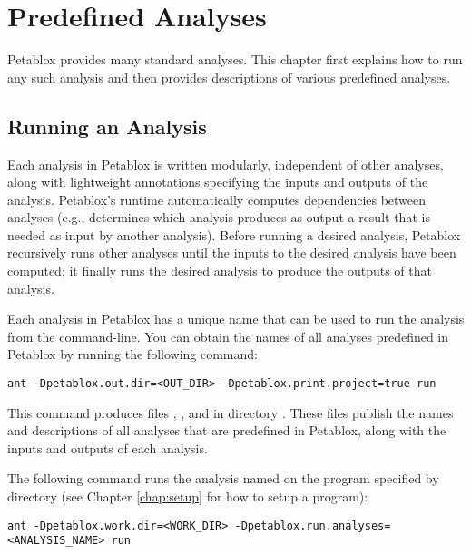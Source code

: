 \chapter{Predefined Analyses}
\label{chap:predefined}

Petablox provides many standard analyses.
This chapter first explains how to run any such analysis and then provides
descriptions of various predefined analyses.

\section{Running an Analysis}
\label{sec:running-predefined}

Each analysis in Petablox is written modularly, independent of other analyses,
along with lightweight annotations specifying the inputs and outputs of the
analysis.  Petablox's runtime automatically computes dependencies between analyses
(e.g., determines which analysis produces as output a result that is needed as
input by another analysis).  Before running a desired analysis, Petablox
recursively runs other analyses until the inputs to the desired analysis have
been computed; it finally runs the desired analysis to produce the outputs of
that analysis.

Each analysis in Petablox has a unique name that can be used to run the
analysis from the command-line.  You can obtain the names of all analyses
predefined in Petablox by running the following command:

\begin{framed}
\begin{verbatim}
ant -Dpetablox.out.dir=<OUT_DIR> -Dpetablox.print.project=true run
\end{verbatim}
\end{framed}

This command produces files , ,
and  in directory .  These
files publish the names and descriptions of all analyses that are predefined in
Petablox, along with the inputs and outputs of each analysis.

The following command runs the analysis
named  on the program specified by directory 
(see Chapter \ref{chap:setup} for how to setup a program):

\begin{framed}
\begin{verbatim}
ant -Dpetablox.work.dir=<WORK_DIR> -Dpetablox.run.analyses=<ANALYSIS_NAME> run
\end{verbatim}
\end{framed}

